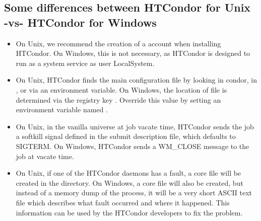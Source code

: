 \subsection{Some differences between HTCondor for Unix -vs- HTCondor for Windows}

\begin{itemize}

\item On Unix, we recommend the creation of a  account
when installing HTCondor.  On Windows, this is not necessary, as HTCondor is
designed to run as a system service as user LocalSystem.

\item On Unix, HTCondor finds the  main configuration
file by looking in \Tilde condor, in , 
or via an environment variable.
On Windows, the location of  file is determined
via the registry key .
Override this value by setting an environment variable named
.

\item On Unix, in the vanilla universe at job vacate time,
HTCondor sends the
job a softkill signal defined in the submit description file,
which defaults to SIGTERM.
On Windows, HTCondor sends a WM\_CLOSE message to the job at vacate
time.

\item On Unix, if one of the HTCondor daemons has a fault, a core file
will be created in the  directory.  
On Windows, a core file will also be created, 
but instead of a memory dump of the process,
it will be a very short ASCII text file which describes what
fault occurred and where it happened.  This information can be used by
the HTCondor developers to fix the problem.

\end{itemize}

